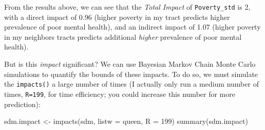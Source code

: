 \documentclass[
]{book}
\newenvironment{Shaded}{\begin{snugshade}}{\end{snugshade}}
\newcommand{\AttributeTok}[1]{\textcolor[rgb]{0.77,0.63,0.00}{#1}}
\newcommand{\DecValTok}[1]{\textcolor[rgb]{0.00,0.00,0.81}{#1}}
\newcommand{\FunctionTok}[1]{\textcolor[rgb]{0.00,0.00,0.00}{#1}}
\newcommand{\NormalTok}[1]{#1}
\newcommand{\OtherTok}[1]{\textcolor[rgb]{0.56,0.35,0.01}{#1}}
\begin{document}
From the results above, we can see that the \emph{Total Impact} of \texttt{Poverty\_std} is 2, with a direct impact of 0.96 (higher poverty in my tract predicts higher prevalence of poor mental health), and an indirect impact of 1.07 (higher poverty in my neighbors tracts predicts additional \emph{higher} prevalence of poor mental health).

But is this \emph{impact} significant? We can use Bayesian Markov Chain Monte Carlo simulations to quantify the bounds of these impacts. To do so, we must simulate the \texttt{impacts()} a large number of times (I actually only run a medium number of times, \texttt{R=199}, for time efficiency; you could increase this number for more prediction):

\begin{Shaded}
\begin{Highlighting}[]
\NormalTok{sdm.impact }\OtherTok{\textless{}{-}} \FunctionTok{impacts}\NormalTok{(sdm, }\AttributeTok{listw =}\NormalTok{ queen, }\AttributeTok{R =} \DecValTok{199}\NormalTok{)}
\FunctionTok{summary}\NormalTok{(sdm.impact)}
\end{Highlighting}
\end{Shaded}
\end{document}
